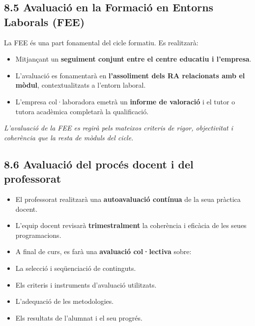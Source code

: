 \documentclass[
  paper=a4,
  ,captions=tableheading
]{scrartcl}
\providecommand{\tightlist}{%
  \setlength{\itemsep}{0pt}\setlength{\parskip}{0pt}}
\renewenvironment{quote}{\begin{customblockquote}\list{}{\rightmargin=0em\leftmargin=0em}%
\item\relax\color{blockquote-text}\ignorespaces}{\unskip\unskip\endlist\end{customblockquote}}
\begin{document}
\hypertarget{avaluaciuxf3-en-la-formaciuxf3-en-entorns-laborals-fee}{%
\subsection{8.5 Avaluació en la Formació en Entorns Laborals
(FEE)}\label{avaluaciuxf3-en-la-formaciuxf3-en-entorns-laborals-fee}}

La FEE és una part fonamental del cicle formatiu. Es realitzarà:

\begin{itemize}
\tightlist
\item
  Mitjançant un \textbf{seguiment conjunt entre el centre educatiu i
  l'empresa}.
\item
  L'avaluació es fonamentarà en \textbf{l'assoliment dels RA relacionats
  amb el mòdul}, contextualitzats a l'entorn laboral.
\item
  L'empresa col·laboradora emetrà un \textbf{informe de valoració} i el
  tutor o tutora acadèmica completarà la qualificació.
\end{itemize}

\begin{quote}
\emph{L'avaluació de la FEE es regirà pels mateixos criteris de rigor,
objectivitat i coherència que la resta de mòduls del cicle.}
\end{quote}

\hypertarget{avaluaciuxf3-del-procuxe9s-docent-i-del-professorat}{%
\subsection{8.6 Avaluació del procés docent i del
professorat}\label{avaluaciuxf3-del-procuxe9s-docent-i-del-professorat}}

\begin{itemize}
\tightlist
\item
  El professorat realitzarà una \textbf{autoavaluació contínua} de la
  seua pràctica docent.
\item
  L'equip docent revisarà \textbf{trimestralment} la coherència i
  eficàcia de les seues programacions.
\item
  A final de curs, es farà una \textbf{avaluació col·lectiva} sobre:
\item
  La selecció i seqüenciació de continguts.
\item
  Els criteris i instruments d'avaluació utilitzats.
\item
  L'adequació de les metodologies.
\item
  Els resultats de l'alumnat i el seu progrés.
\end{itemize}
\end{document}
